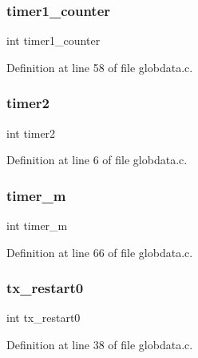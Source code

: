 \subsubsection{timer1\+\_\+counter}
{\footnotesize\ttfamily int timer1\+\_\+counter}



Definition at line 58 of file globdata.\+c.

\mbox{\label{globdata_8c_a8d81fe249a7ca1b7b1c7c9378da8f006}} 
\subsubsection{timer2}
{\footnotesize\ttfamily int timer2}



Definition at line 6 of file globdata.\+c.

\mbox{\label{globdata_8c_af0a20ab26c2b3b439005217214274f46}} 
\subsubsection{timer\+\_\+m}
{\footnotesize\ttfamily int timer\+\_\+m}



Definition at line 66 of file globdata.\+c.

\mbox{\label{globdata_8c_a4e4a764ef1e2e444d44c2c733f23f28d}} 
\subsubsection{tx\+\_\+restart0}
{\footnotesize\ttfamily int tx\+\_\+restart0}



Definition at line 38 of file globdata.\+c.

